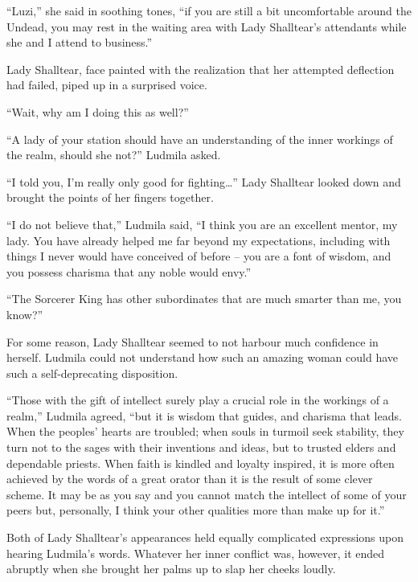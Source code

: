  

“Luzi,” she said in soothing tones, “if you are still a bit uncomfortable around the Undead, you may rest in the waiting area with Lady Shalltear’s attendants while she and I attend to business.”

 

Lady Shalltear, face painted with the realization that her attempted deflection had failed, piped up in a surprised voice.

 

“Wait, why am I doing this as well?”

 

“A lady of your station should have an understanding of the inner workings of the realm, should she not?” Ludmila asked.

 

“I told you, I’m really only good for fighting…” Lady Shalltear looked down and brought the points of her fingers together.

 

“I do not believe that,” Ludmila said, “I think you are an excellent mentor, my lady. You have already helped me far beyond my expectations, including with things I never would have conceived of before – you are a font of wisdom, and you possess charisma that any noble would envy.”

 

“The Sorcerer King has other subordinates that are much smarter than me, you know?”

 

For some reason, Lady Shalltear seemed to not harbour much confidence in herself. Ludmila could not understand how such an amazing woman could have such a self-deprecating disposition.

 

“Those with the gift of intellect surely play a crucial role in the workings of a realm,” Ludmila agreed, “but it is wisdom that guides, and charisma that leads. When the peoples’ hearts are troubled; when souls in turmoil seek stability, they turn not to the sages with their inventions and ideas, but to trusted elders and dependable priests. When faith is kindled and loyalty inspired, it is more often achieved by the words of a great orator than it is the result of some clever scheme. It may be as you say and you cannot match the intellect of some of your peers but, personally, I think your other qualities more than make up for it.”

 

Both of Lady Shalltear’s appearances held equally complicated expressions upon hearing Ludmila’s words. Whatever her inner conflict was, however, it ended abruptly when she brought her palms up to slap her cheeks loudly.

